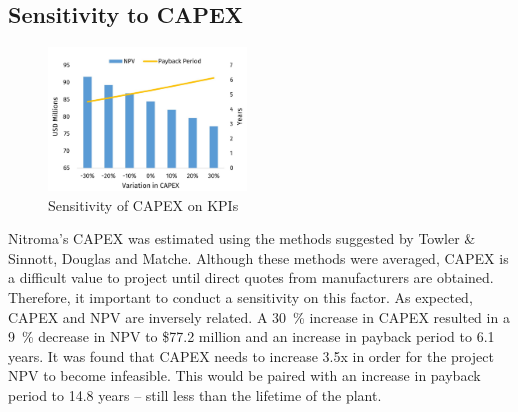 \subsection{Sensitivity to CAPEX}
\begin{figure}
    \vspace{-0.9cm}
    \caption{Sensitivity of CAPEX on KPIs}
    \label{Sensitivity_CAPEX}
    \includegraphics[width=0.47\textwidth]{chapters/6-economics/figures/Sensitivity_CAPEX.jpg}
\end{figure}
Nitroma’s CAPEX was estimated using the methods suggested by Towler \& Sinnott, Douglas and Matche. Although these methods were averaged, CAPEX is a difficult value to project until direct quotes from manufacturers are obtained. Therefore, it important to conduct a sensitivity on this factor. As expected, CAPEX and NPV are inversely related. A \SI{30}{\percent} increase in CAPEX resulted in a \SI{9}{\percent} decrease in NPV to \$77.2 million and an increase in payback period to 6.1 years. It was found that CAPEX needs to increase 3.5x in order for the project NPV to become infeasible. This would be paired with an increase in payback period to 14.8 years – still less than the lifetime of the plant.

